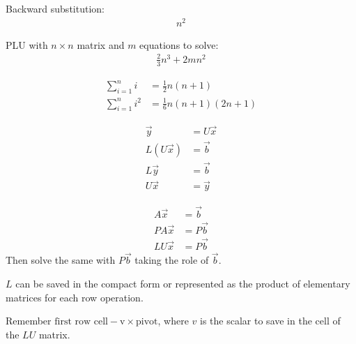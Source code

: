 \documentclass[12pt]{article}
\begin{document}
Backward substitution:
\begin{align*}
    n^2
\end{align*}

PLU with $n \times n$ matrix and $m$ equations to solve:
\begin{align*}
    \frac{2}{3} n^3 + 2 m n^2
\end{align*}

\begin{align*}
    \sum_{i=1}^n i &= \frac{1}{2}n (n + 1) \\
    \sum_{i=1}^n i^2 &= \frac{1}{6} n (n + 1) (2n + 1)
\end{align*}

\begin{align*}
    \vec{y} &= U\vec{x} \\
    L(U\vec{x}) &= \vec{b} \\
    L\vec{y} &= \vec{b} \\
    U\vec{x} &= \vec{y}
\end{align*}

\begin{align*}
    A\vec{x} &= \vec{b} \\
    PA\vec{x} &= P\vec{b} \\
    LU\vec{x} &= P\vec{b}
\end{align*}
Then solve the same with $P\vec{b}$ taking the role of $\vec{b}$.

$L$ can be saved in the compact form or represented as the product of elementary matrices for each row operation.

Remember $\text{first row cell} - \text{v} \times \text{pivot}$, where $v$ is the scalar to save in the cell of the $LU$ matrix.
\end{document}

